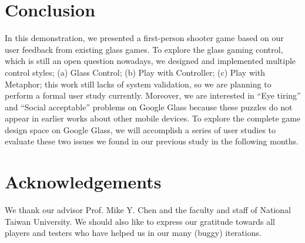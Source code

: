 \documentclass{sigchi}
\begin{document}
\section{Conclusion}
In this demonstration, we presented a first-person shooter game based on our user feedback from existing glass games. To explore the glass gaming control, which is still an open question nowadays, we designed and implemented multiple control styles; (a) Glass Control; (b) Play with Controller; (c) Play with Metaphor; this work still lacks of system validation, so we are planning to perform a formal user study currently. Moreover, we are interested in ``Eye tiring'' and ``Social acceptable'' problems on Google Glass because these puzzles do not appear in earlier works about other mobile devices.
To explore the complete game design space on Google Glass, we will accomplish a series of user studies to evaluate these two issues we found in our previous study in the following months. 


\section{Acknowledgements}
We thank our advisor Prof. Mike Y. Chen and the faculty and staff of National Taiwan University. We should also like to express our gratitude towards all players and testers who have helped us in our many (buggy) iterations.

\balance



\end{document}
